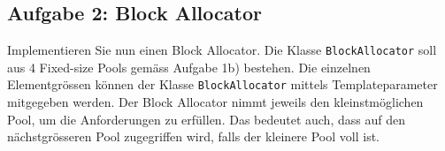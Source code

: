 \subsection{Aufgabe 2: Block Allocator}
Implementieren Sie nun einen Block Allocator. Die Klasse \texttt{BlockAllocator} soll aus 4 Fixed-size Pools gemäss Aufgabe 1b) bestehen. Die einzelnen Elementgrössen können der Klasse \texttt{BlockAllocator} mittels Templateparameter mitgegeben werden. Der Block Allocator nimmt jeweils den kleinstmöglichen Pool, um die Anforderungen zu erfüllen. Das bedeutet auch, dass auf den nächstgrösseren Pool zugegriffen wird, falls der kleinere Pool voll ist.

\noindent\makebox[\linewidth]{\rule{\paperwidth}{0.4pt}}

\noindent\makebox[\linewidth]{\rule{\paperwidth}{0.4pt}}

